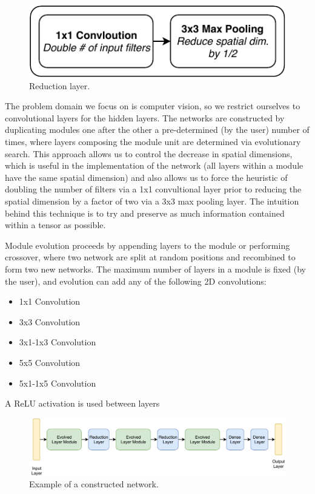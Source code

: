\documentclass[conference]{IEEEtran}
\begin{document}
\begin{figure}
  \includegraphics{img/reduction}
  \caption{Reduction layer.}
  \label{fig:reduction}
\end{figure}

The problem domain we focus on is computer vision, so we restrict ourselves
to convolutional layers for the hidden layers. The networks are constructed
by duplicating modules one after the other a pre-determined (by the user)
number of times, where layers composing the module unit are
determined via evolutionary search. This approach allows us to control the
decrease in spatial dimensions, which is useful in the implementation of
the network (all layers within a module have the same spatial dimension)
and also allows us to force the heuristic of doubling the number of filters
via a 1x1 convultional layer prior to reducing the spatial dimension by a
factor of two via a 3x3 max pooling layer. The intuition behind this
technique is to try and preserve as much information contained within a
tensor as possible.

Module evolution proceeds by appending layers to the module or performing
crossover, where two network are split at random positions and recombined
to form two new networks. The maximum number of layers in a module is fixed
(by the user), and evolution can add any of the following 2D convolutions:
\begin{itemize}
\item 1x1 Convolution
\item 3x3 Convolution
\item 3x1-1x3 Convolution
\item 5x5 Convolution
\item 5x1-1x5 Convolution
\end{itemize}
A ReLU activation is used between layers

\begin{figure}
  \includegraphics{img/sample_arch}
  \caption[width=.75\textwidth]{Example of a constructed network.}
  \label{fig:sample-arch}
\end{figure}
\end{document}
